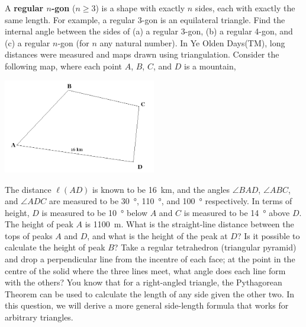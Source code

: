 \documentclass{exam}
\begin{document}
\begin{questions}
\begin{center}
          \end{center}
\question A \textbf{regular $n$-gon} ($ n \geq 3 $) is a shape with exactly $ n $ sides, each with exactly the same length. For example,
          a regular 3-gon is an equilateral triangle. Find the internal angle between the sides of (a) a regular 3-gon, (b) a regular 4-gon,
          and (c) a regular $n$-gon (for $ n $ any natural number).
\question In Ye Olden Days(TM), long distances were measured and maps drawn using triangulation. Consider the following map, where each
          point $ A $, $ B $, $ C $, and  $ D $ is a mountain,
          \begin{center}
            \includegraphics[width=0.5\textwidth]{survey}
          \end{center}
          The distance $ \ell(AD) $ is known to be \SI{16}{\kilo\metre}, and the angles $ \angle BAD $, $ \angle ABC $, and $ \angle ADC $ are measured
          to be \SI{30}{\degree}, \SI{110}{\degree}, and \SI{100}{\degree} respectively. In terms of height, $ D $ is measured to be \SI{10}{\degree}
          below $ A $ and $ C $ is measured to be \SI{14}{\degree} above $ D $. The height of peak $ A $ is \SI{1100}{\metre}. What is the straight-line
          distance between the tops of peaks $ A $ and $ D $, and what is the height of the peak at $ D $? Is it possible to calculate the height
          of peak $ B $?
\question Take a regular tetrahedron (triangular pyramid) and drop a perpendicular line from the incentre of each face; at the point in the
          centre of the solid where the three lines meet, what angle does each line form with the others?
\question You know that for a right-angled triangle, the Pythagorean Theorem can be used to calculate the length of any side given the
          other two. In this question, we will derive a more general side-length formula that works for arbitrary triangles.
          

\end{questions}
\end{document}

